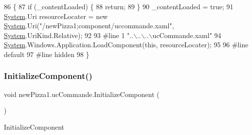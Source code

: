 \begin{DoxyCode}
86                                           \{
87             \textcolor{keywordflow}{if} (\_contentLoaded) \{
88                 \textcolor{keywordflow}{return};
89             \}
90             \_contentLoaded = \textcolor{keyword}{true};
91             \hyperlink{namespaceSystem}{System}.Uri resourceLocater = \textcolor{keyword}{new} \hyperlink{namespaceSystem}{System}.Uri(\textcolor{stringliteral}{"/newPizza1;component/uccommande.xaml"},
       \hyperlink{namespaceSystem}{System}.UriKind.Relative);
92             
93 \textcolor{preprocessor}{            #line 1 "..\(\backslash\)..\(\backslash\)..\(\backslash\)ucCommande.xaml"}
94             \hyperlink{namespaceSystem}{System}.Windows.Application.LoadComponent(\textcolor{keyword}{this}, resourceLocater);
95             
96 \textcolor{preprocessor}{            #line default}
97 \textcolor{preprocessor}{            #line hidden}
98         \}
\end{DoxyCode}
\mbox{\label{classnewPizza1_1_1ucCommande_a3f6251cc87dd9f2a2db45c5413ce1711}} 
\subsubsection{\texorpdfstring{Initialize\+Component()}{InitializeComponent()}\hspace{0.1cm}{\footnotesize\ttfamily [5/6]}}
{\footnotesize\ttfamily void new\+Pizza1.\+uc\+Commande.\+Initialize\+Component (\begin{DoxyParamCaption}{ }\end{DoxyParamCaption})\hspace{0.3cm}{\ttfamily [inline]}}



Initialize\+Component 


